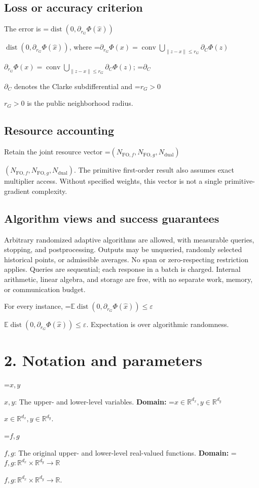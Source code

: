 \documentclass[10pt,a4paper]{article}
\newcommand{\AtlasMath}[1]{\par\begingroup\centering\setbox0=\hbox{$\displaystyle #1$}\ifdim\wd0>1.4\linewidth\typeout{ATLAS WIDE FORMULA: \the\wd0}\fi\ifdim\wd0>\linewidth\resizebox{\linewidth}{!}{\box0}\else\box0\fi\par\endgroup}
\newcommand{\AtlasInlineMath}[1]{\begingroup\setbox0=\hbox{$#1$}\ifdim\wd0>.4\linewidth\endgroup\AtlasMath{#1}\else\endgroup$#1$\fi}
\begin{document}
\subsection{Loss or accuracy criterion}
The error is \AtlasInlineMath{\operatorname{dist}(0,\partial_{r_G}\Phi(\widehat{x}))}, where \AtlasInlineMath{\partial_{r_G}\Phi(x)=\operatorname{conv}\bigcup_{\|z-x\|\le r_G}\partial_C\Phi(z)}; \AtlasInlineMath{\partial_C} denotes the Clarke subdifferential and \AtlasInlineMath{r_G>0} is the public neighborhood radius.

\subsection{Resource accounting}
Retain the joint resource vector \AtlasInlineMath{(N_{\mathrm{FO},f},N_{\mathrm{FO},g},N_{\mathrm{dual}})}. The primitive first-order result also assumes exact multiplier access. Without specified weights, this vector is not a single primitive-gradient complexity.

\subsection{Algorithm views and success guarantees}
Arbitrary randomized adaptive algorithms are allowed, with measurable queries, stopping, and postprocessing. Outputs may be unqueried, randomly selected historical points, or admissible averages. No span or zero-respecting restriction applies. Queries are sequential; each response in a batch is charged. Internal arithmetic, linear algebra, and storage are free, with no separate work, memory, or communication budget.

For every instance, \AtlasInlineMath{\mathbb{E}\operatorname{dist}(0,\partial_{r_G}\Phi(\widehat{x}))\le\varepsilon}. Expectation is over algorithmic randomness.

\section{2. Notation and parameters}
\AtlasInlineMath{x,y}: The upper- and lower-level variables. \textbf{Domain:} \AtlasInlineMath{x\in\mathbb R^{d_x},y\in\mathbb R^{d_y}}.

\AtlasInlineMath{f,g}: The original upper- and lower-level real-valued functions. \textbf{Domain:} \AtlasInlineMath{f,g:\mathbb R^{d_x}\times\mathbb R^{d_y}\to\mathbb R}.
\end{document}
